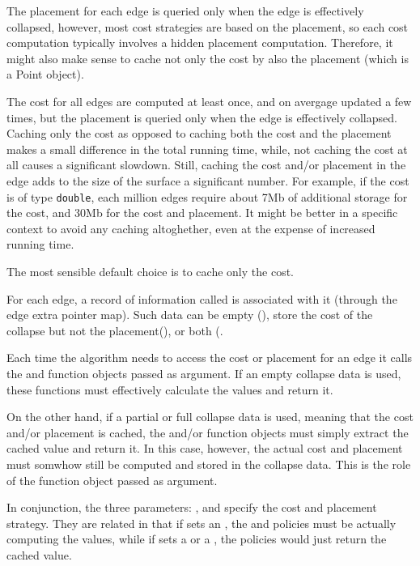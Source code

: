 The placement for each edge is queried only when the edge is effectively collapsed, however, most cost strategies are based on the placement, so each cost computation typically involves a hidden placement computation. Therefore, it might also make sense to cache not only the cost by also the placement (which is a Point object).

The cost for all edges are computed at least once, and on avergage updated a few times, but the placement is queried only when the edge is effectively collapsed. Caching only the cost as opposed to caching both the cost and the placement makes a small difference in the total running time, while, not caching the cost at all causes a significant slowdown. Still, caching the cost and/or placement in the edge adds to the size of the surface a significant number. For example, if the cost is of type {\tt double}, each million edges require about 7Mb of additional storage for the cost, and 30Mb for the cost and placement. It might be better in a specific context to avoid any caching altoghether, even at the expense of increased running time.

The most sensible default choice is to cache only the cost.

For each edge, a record of information called  is associated with it (through the edge extra pointer map). Such data can be empty (), store the cost of the collapse but not the placement(), or both (.

Each time the algorithm needs to access the cost or placement for an edge it calls the  and  function objects passed as argument. If an empty collapse data is used, these functions must effectively calculate the values and return it.

On the other hand, if a partial or full collapse data is used, meaning that the cost and/or placement is cached, the  and/or  function objects must simply extract the cached value and return it. In this case, however, the actual cost and placement must somwhow still be computed and stored in the collapse data. This is the role of the  function object passed as argument.

In conjunction, the three parameters: ,  and  specify the cost and placement strategy. They are related in that if  sets an , the  and  policies must be actually computing the values, while if  sets a  or a , the policies would just return the cached value.

